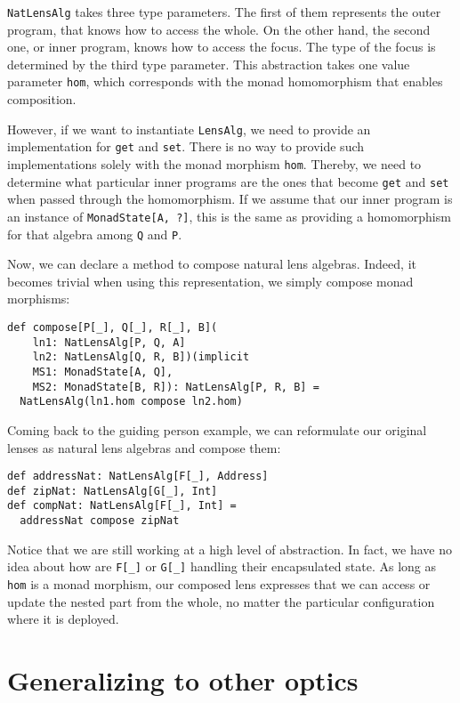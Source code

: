 \documentclass[preview, 3p]{elsarticle}
\begin{document}
\lstinline{NatLensAlg} takes three type parameters. The first of them represents
the outer program, that knows how to access the whole. On the other hand, the
second one, or inner program, knows how to access the focus. The type of the
focus is determined by the third type parameter. This abstraction takes one
value parameter \lstinline{hom}, which corresponds with the monad homomorphism
that enables composition.

However, if we want to instantiate \lstinline{LensAlg}, we need to provide an
implementation for \lstinline{get} and \lstinline{set}. There is no way to
provide such implementations solely with the monad morphism \lstinline{hom}.
Thereby, we need to determine what particular inner programs are the ones that
become \lstinline{get} and \lstinline{set} when passed through the homomorphism.
If we assume that our inner program is an instance of \lstinline{MonadState[A, ?]},
this is the same as providing a homomorphism for that algebra among
\lstinline{Q} and \lstinline{P}.

Now, we can declare a method to compose natural lens algebras. Indeed, it
becomes trivial when using this representation, we simply compose monad
morphisms:

\begin{lstlisting}
def compose[P[_], Q[_], R[_], B](
    ln1: NatLensAlg[P, Q, A]
    ln2: NatLensAlg[Q, R, B])(implicit
    MS1: MonadState[A, Q],
    MS2: MonadState[B, R]): NatLensAlg[P, R, B] =
  NatLensAlg(ln1.hom compose ln2.hom)
\end{lstlisting}

Coming back to the guiding person example, we can reformulate our original
lenses as natural lens algebras and compose them:

\begin{lstlisting}
def addressNat: NatLensAlg[F[_], Address]
def zipNat: NatLensAlg[G[_], Int]
def compNat: NatLensAlg[F[_], Int] =
  addressNat compose zipNat
\end{lstlisting}

Notice that we are still working at a high level of abstraction. In fact, we
have no idea about how are \lstinline{F[_]} or \lstinline{G[_]} handling their
encapsulated state. As long as \lstinline{hom} is a monad morphism, our composed
lens expresses that we can access or update the nested part from the whole, no
matter the particular configuration where it is deployed.

\section{Generalizing to other optics}
\label{sec:Generalizing}
\end{document}
